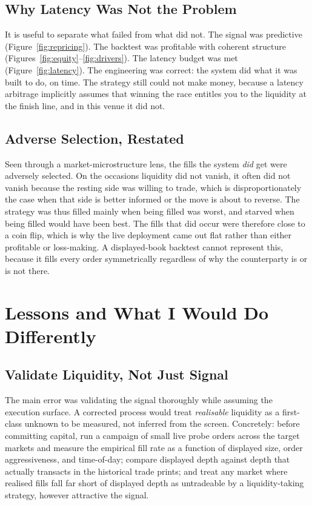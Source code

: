 \documentclass{tmsce}
\let\oldsection\section
\renewcommand{\section}{\clearpage\oldsection}
\begin{document}
\subsection{Why Latency Was Not the Problem}

It is useful to separate what failed from what did not. The signal was predictive
(Figure~\ref{fig:repricing}). The backtest was profitable with coherent structure
(Figures~\ref{fig:equity}--\ref{fig:drivers}). The latency budget was met
(Figure~\ref{fig:latency}). The engineering was correct: the system did what it was
built to do, on time. The strategy still could not make money, because a latency
arbitrage implicitly assumes that winning the race entitles you to the liquidity at
the finish line, and in this venue it did not.

\subsection{Adverse Selection, Restated}

Seen through a market-microstructure lens, the fills the system \emph{did} get were
adversely selected. On the occasions liquidity did not vanish, it often did not
vanish because the resting side was willing to trade, which is disproportionately the
case when that side is better informed or the move is about to reverse. The strategy
was thus filled mainly when being filled was worst, and starved when being filled
would have been best. The fills that did occur were therefore close to a coin flip,
which is why the live deployment came out flat rather than either profitable or
loss-making. A displayed-book backtest cannot represent this, because it
fills every order symmetrically regardless of why the counterparty is or is not
there.


\section{Lessons and What I Would Do Differently}

\subsection{Validate Liquidity, Not Just Signal}

The main error was validating the signal thoroughly while assuming the execution
surface. A corrected process would treat \emph{realisable} liquidity as a
first-class unknown to be measured, not inferred from the screen. Concretely: before
committing capital, run a campaign of small live probe orders across the target
markets and measure the empirical fill rate as a function of displayed size, order
aggressiveness, and time-of-day; compare displayed depth against depth that actually
transacts in the historical trade prints; and treat any market where realised fills
fall far short of displayed depth as untradeable by a liquidity-taking strategy,
however attractive the signal.
\end{document}
